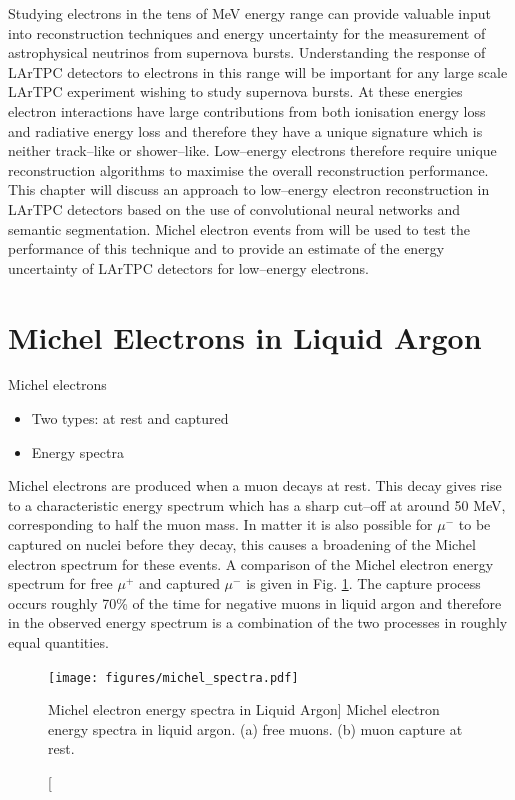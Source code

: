 Studying electrons in the tens of MeV energy range can provide valuable input 
into reconstruction techniques and energy uncertainty for the measurement of
astrophysical neutrinos from supernova bursts. Understanding the response of
LArTPC detectors to electrons in this range will be important for any large
scale LArTPC experiment wishing to study supernova bursts. At these energies
electron interactions have large contributions from both ionisation energy loss
and radiative energy loss and therefore they have a unique signature which is 
neither track--like or shower--like. Low--energy electrons therefore require 
unique reconstruction algorithms to maximise the overall reconstruction 
performance. This chapter will discuss an approach to low--energy electron
reconstruction in LArTPC detectors based on the use of convolutional neural
networks and semantic segmentation. Michel electron events from \protodune{} will
be used to test the performance of this technique and to provide an estimate of
the energy uncertainty of LArTPC detectors for low--energy electrons.


\section{Michel Electrons in Liquid Argon} \label{ME_LAr}
\begin{mccorrection}
	Michel electrons
	\begin{itemize}
	\item Two types: at rest and captured
	\item Energy spectra
	\end{itemize}
\end{mccorrection}

Michel electrons are produced when a muon decays at rest. This decay gives rise
to a characteristic energy spectrum which has a sharp cut--off at around 50 MeV,
corresponding to half the muon mass. In matter it is also possible for $\mu^-$ 
to be captured on nuclei before they decay, this causes a broadening of the 
Michel electron spectrum for these events. A comparison of the Michel electron 
energy spectrum for free $\mu^+$ and captured $\mu^-$ is given in Fig.
\ref{fig:michel_spec}. The capture process occurs roughly 70\% of the time for
negative muons in liquid argon and therefore in \protodune{} the observed energy
spectrum is a combination of the two processes in roughly equal quantities.

\begin{figure}

	\centering

	\texttt{[image: figures/michel\_spectra.pdf]}

	\caption
	[Michel electron energy spectra in Liquid Argon]
	{Michel electron energy spectra in liquid argon. (a) free muons. (b) muon 
	capture at rest.}

	\label{fig:michel_spec}

\end{figure}

